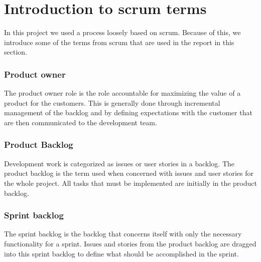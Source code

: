 \section{Introduction to scrum terms}
In this project we used a process loosely based on scrum.
Because of this, we introduce some of the terms from scrum that are used in the report in this section.

\subsubsection{Product owner}
The product owner role is the role accountable for maximizing the value of a product for the customers.
This is generally done through incremental management of the backlog and by defining expectations with the customer that are then communicated to the development team.

\subsubsection{Product Backlog}
Development work is categorized as issues or user stories in a backlog.
The product backlog is the term used when concerned with issues and user stories for the whole project.
All tasks that must be implemented are initially in the product backlog. 

\subsubsection{Sprint backlog}
The sprint backlog is the backlog that concerns itself with only the necessary functionality for a sprint.
Issues and stories from the product backlog are dragged into this sprint backlog to define what should be accomplished in the sprint. 
